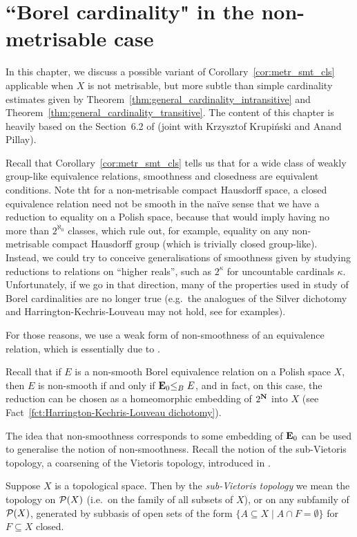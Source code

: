 
	\chapter{``Borel cardinality" in the non-metrisable case}
	\label{chap:nonmetrisable_card}
	In this chapter, we discuss a possible variant of Corollary~\ref{cor:metr_smt_cls} applicable when $X$ is not metrisable, but more subtle than simple cardinality estimates given by Theorem~\ref{thm:general_cardinality_intransitive} and Theorem~\ref{thm:general_cardinality_transitive}.
	The content of this chapter is heavily based on the Section~6.2 of \cite{KPR15} (joint with Krzysztof Krupiński and Anand Pillay).
	
	Recall that Corollary~\ref{cor:metr_smt_cls} tells us that for a wide class of weakly group-like equivalence relations, smoothness and closedness are equivalent conditions. Note tht for a non-metrisable compact Hausdorff space, a closed equivalence relation need not be smooth in the naïve sense that we have a reduction to equality on a Polish space, because that would imply having no more than $2^{\aleph_0}$ classes, which rule out, for example, equality on any non-metrisable compact Hausdorff group (which is trivially closed group-like). Instead, we could try to conceive generalisations of smoothness given by studying reductions to relations on ``higher reals'', such as $2^\kappa$ for uncountable cardinals $\kappa$. Unfortunately, if we go in that direction, many of the properties used in study of Borel cardinalities are no longer true (e.g.\ the analogues of the Silver dichotomy and Harrington-Kechris-Louveau may not hold, see \cite{THK14} for examples).
	
	For those reasons, we use a weak form of non-smoothness of an equivalence relation, which is essentially due to \cite{KMS14}.
	
	
	Recall that if $E$ is a non-smooth Borel equivalence relation on a Polish space $X$, then $E$ is non-smooth if and only if $\mathrel{ { {\mathbf E}_0 } }\leq_B E$, and in fact, on this case, the reduction can be chosen as a homeomorphic embedding of $2^{{\mathbf{N}}}$ into $X$ (see Fact~\ref{fct:Harrington-Kechris-Louveau dichotomy}).
	
	The idea that non-smoothness corresponds to some embedding of $\mathrel{ { {\mathbf E}_0 } }$ can be used to generalise the notion of non-smoothness. Recall the notion of the sub-Vietoris topology, a coarsening of the Vietoris topology, introduced in \cite{KR16}.
	
	\begin{dfn}
		Suppose $X$ is a topological space. Then by the {\em sub-Vietoris topology} we mean the topology on ${\mathcal P}(X)$ (i.e.\ on the family of all subsets of $X$), or on any subfamily of ${\mathcal P}(X)$, generated by subbasis of open sets of the form $\{A\subseteq X\mid A\cap F=\emptyset\}$ for $F\subseteq X$ closed.
		\xqed{\lozenge}
	\end{dfn}
	
